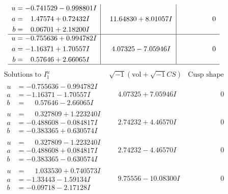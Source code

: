 \documentclass[1p]{elsarticle_modified}
\theoremstyle{definition}
\newcommand{\I}{\sqrt{-1}}
\begin{document}
$$\begin{array}{c|c|c}
\begin{aligned}
u &= -0.741529 - 0.998801 I \\
a &= \phantom{-}1.47574 + 0.72432 I \\
b &= \phantom{-}0.06701 + 2.18200 I\end{aligned}
 & \phantom{-}11.64830 + 8.01057 I & \phantom{-0.000000 } 0 \\ \hline\begin{aligned}
u &= -0.755636 + 0.994782 I \\
a &= -1.16371 + 1.70557 I \\
b &= \phantom{-}0.57646 + 2.66065 I\end{aligned}
 & \phantom{-}4.07325 - 7.05946 I & \phantom{-0.000000 } 0\\
 \hline 
 \end{array}$$\newpage$$\begin{array}{c|c|c}  
\text{Solutions to }I^u_{1}& \I (\text{vol} + \sqrt{-1}CS) & \text{Cusp shape}\\
 \hline 
\begin{aligned}
u &= -0.755636 - 0.994782 I \\
a &= -1.16371 - 1.70557 I \\
b &= \phantom{-}0.57646 - 2.66065 I\end{aligned}
 & \phantom{-}4.07325 + 7.05946 I & \phantom{-0.000000 } 0 \\ \hline\begin{aligned}
u &= \phantom{-}0.327809 + 1.223240 I \\
a &= -0.488608 - 0.084817 I \\
b &= -0.383365 + 0.630574 I\end{aligned}
 & \phantom{-}2.74232 + 4.46570 I & \phantom{-0.000000 } 0 \\ \hline\begin{aligned}
u &= \phantom{-}0.327809 - 1.223240 I \\
a &= -0.488608 + 0.084817 I \\
b &= -0.383365 - 0.630574 I\end{aligned}
 & \phantom{-}2.74232 - 4.46570 I & \phantom{-0.000000 } 0 \\ \hline\begin{aligned}
u &= \phantom{-}1.033530 + 0.740573 I \\
a &= -1.33443 - 1.59134 I \\
b &= -0.09718 - 2.17128 I\end{aligned}
 & \phantom{-}9.75556 - 10.08300 I & \phantom{-0.000000 } 0 \\ \hline\begin{aligned}

\end{aligned}
\end{array}$$
\end{document}
